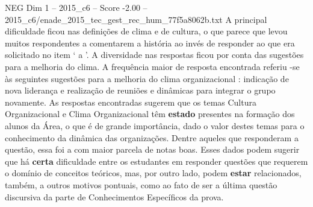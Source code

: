 \begin{textsample}{NEG Dim 1 – 2015\_c6 – Score -2.00 – 2015\_c6/enade\_2015\_tec\_gest\_rec\_hum\_77f5a8062b.txt}
A principal dificuldade ficou nas definições de clima e de cultura, o que parece que levou muitos respondentes a comentarem a história ao invés de responder ao que era solicitado no item ‘ a ’.
A diversidade nas respostas ficou por conta das sugestões para a melhoria do clima.
A frequência maior de resposta encontrada referiu -se às seguintes sugestões para a melhoria do clima organizacional : indicação de nova liderança e realização de reuniões e dinâmicas para integrar o grupo novamente.
As respostas encontradas sugerem que os temas Cultura Organizacional e Clima Organizacional têm \textbf{estado} presentes na formação dos alunos da Área, o que é de grande importância, dado o valor destes temas para o conhecimento da dinâmica das organizações.
Dentre aqueles que responderam a questão, essa foi a com maior parcela de notas boas.
Esses dados podem sugerir que há \textbf{certa} dificuldade entre os estudantes em responder questões que requerem o domínio de conceitos teóricos, mas, por outro lado, podem \textbf{estar} relacionados, também, a outros motivos pontuais, como ao fato de ser a última questão discursiva da parte de Conhecimentos Específicos da prova.

\end{textsample}
